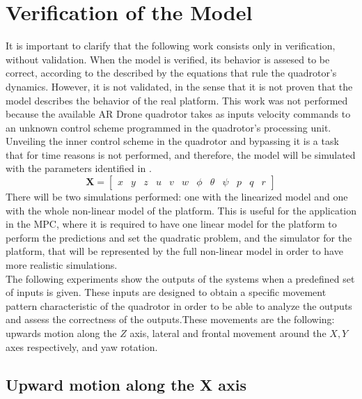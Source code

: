 \section{Verification of the Model}


It is important to clarify that the following work consists only in verification, without validation. When the model is verified, its behavior is assesed to be correct, according to the described by the equations that rule the quadrotor's dynamics. However, it is not validated, in the sense that it is not proven that the model describes the behavior of the real platform. This work was not performed because the available AR Drone quadrotor takes as inputs velocity commands to an unknown control scheme programmed in the quadrotor's processing unit. Unveiling the inner control scheme in the quadrotor and bypassing it is a task that for time reasons is not performed, and therefore, the model will be simulated with the parameters identified in \cite{YueSun2012}. \\
\begin{equation} \label{eq:statevector}
\mathbf{X} = \begin{bmatrix} x & y & z & u & v & w & \phi & \theta & \psi & p & q & r \end{bmatrix}
\end{equation} 
There will be two simulations performed: one with the linearized model and one with the whole non-linear model of the platform. This is useful for the application in the MPC, where it is required to have one linear model for the platform to perform the predictions and set the quadratic problem, and the simulator for the platform, that will be represented by the full non-linear model in order to have more realistic simulations. \\

The following experiments show the outputs of the systems when a predefined set of inputs is given. These inputs are designed to obtain a specific movement pattern characteristic of the quadrotor in order to be able to analyze the outputs and assess the correctness of the outputs.These movements are the following: upwards motion along the $Z$ axis, lateral and frontal movement around the $X,Y$ axes respectively, and yaw rotation. 

\subsection{Upward motion along the X axis}

